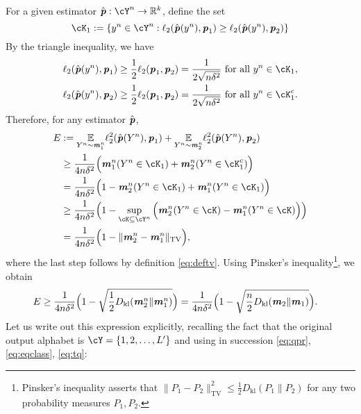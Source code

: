 \documentclass[11pt,onecolumn]{IEEEtran}
\def\mathbi#1{{\textbf{\textit #1}}}
\DeclareMathOperator{\TV}{TV}
\DeclareMathOperator{\kl}{kl}
\begin{document}
For a given estimator $\hat{\mathbi{p}}:\cY^n\to\mathbb{R}^k$,  define the set 
   $$
   \cK_1:= \{y^n\in\cY^n: 
\ell_2(\hat{\mathbi{p}}(y^n),\mathbi{p}_1)
\ge \ell_2(\hat{\mathbi{p}}(y^n),\mathbi{p}_2)\}
   $$
By the triangle inequality, we have
\begin{align*}
\ell_2(\hat{\mathbi{p}}(y^n),\mathbi{p}_1) \ge \frac{1}{2}
\ell_2(\mathbi{p}_1,\mathbi{p}_2) = \frac{1}{2\sqrt{n\delta^2}}
\text{~for all~} y^n\in \cK_1, \\
\ell_2(\hat{\mathbi{p}}(y^n),\mathbi{p}_2) \ge \frac{1}{2}
\ell_2(\mathbi{p}_1,\mathbi{p}_2) = \frac{1}{2\sqrt{n\delta^2}}
\text{~for all~} y^n\in \cK_1^c.
\end{align*}
Therefore, for any estimator $\hat{\mathbi{p}}$,
\begin{align*}
E&:=\underset{Y^n\sim \mathbi{m}_1^n}{\mathbb{E}} \ell_2^2(\hat{\mathbi{p}}(Y^n), \mathbi{p}_1) +
\underset{Y^n\sim \mathbi{m}_2^n}{\mathbb{E}} \ell_2^2(\hat{\mathbi{p}}(Y^n), \mathbi{p}_2 )\\ 
&\ge  \frac{1}{4 n\delta^2} \Big(\mathbi{m}_1^n (Y^n\in \cK_1)
+ \mathbi{m}_2^n (Y^n\in \cK_1^c) \Big) \\
&=  \frac{1}{4 n\delta^2} \Big(1 - \mathbi{m}_2^n (Y^n\in \cK_1) + \mathbi{m}_1^n (Y^n\in \cK_1) \Big) \\
&\ge   \frac{1}{4 n\delta^2} \Big(1 - 
\sup_{\cK\subseteq \cY^n}\Big(\mathbi{m}_2^n (Y^n\in \cK) - \mathbi{m}_1^n (Y^n\in \cK) \Big) \Big) \\
&= \frac{1}{4 n\delta^2} \Big(1 - 
\| \mathbi{m}_2^n - \mathbi{m}_1^n \|_{\TV} \Big) ,
\end{align*}
where the last step follows by definition \eqref{eq:deftv}. Using Pinsker's inequality\footnote{Pinsker's inequality 
asserts that $\|P_1-P_2\|_{\TV}^2\le \frac12 D_{\kl}(P_1\|P_2)$ for any two probability measures $P_1,P_2$.}, we obtain
\begin{align*}
E&\ge \frac{1}{4 n\delta^2} \Big(1 - 
\sqrt{\frac{1}{2}D_{\kl}(\mathbi{m}_2^n \| \mathbi{m}_1^n)} \Big) 
= \frac{1}{4 n\delta^2} \Big(1 - 
\sqrt{\frac{n}{2}D_{\kl}(\mathbi{m}_2 \| \mathbi{m}_1)} \Big).
\end{align*}
Let us write out this expression explicitly, recalling the fact that the original output alphabet is $\cY=\{1,2,\dots,L'\}$ and using in succession \eqref{eq:qpr}, \eqref{eq:eqclass}, \eqref{eq:tq}:
\end{document}
